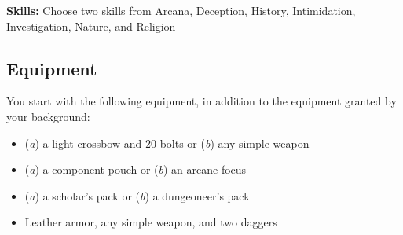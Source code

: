\textbf{Skills:} Choose two skills from Arcana, Deception, History, Intimidation, Investigation, Nature, and Religion

\subsection{Equipment}

You start with the following equipment, in addition to the equipment granted by your background:
\begin{itemize}
\item (\textit{a}) a light crossbow and 20 bolts or (\textit{b}) any simple weapon
\item (\textit{a}) a component pouch or (\textit{b}) an arcane focus
\item (\textit{a}) a scholar's pack or (\textit{b}) a dungeoneer's pack
\item Leather armor, any simple weapon, and two daggers
\end{itemize}

